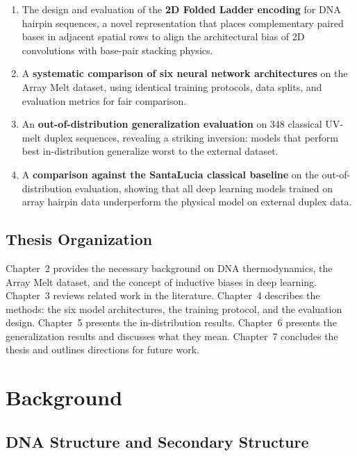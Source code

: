 \documentclass[12pt,oneside,letterpaper]{report}
\begin{document}
\begin{enumerate}
    \item The design and evaluation of the \textbf{2D Folded Ladder encoding} for DNA hairpin sequences, a novel representation that places complementary paired bases in adjacent spatial rows to align the architectural bias of 2D convolutions with base-pair stacking physics.
    \item A \textbf{systematic comparison of six neural network architectures} on the Array Melt dataset, using identical training protocols, data splits, and evaluation metrics for fair comparison.
    \item An \textbf{out-of-distribution generalization evaluation} on 348 classical UV-melt duplex sequences, revealing a striking inversion: models that perform best in-distribution generalize worst to the external dataset.
    \item A \textbf{comparison against the SantaLucia classical baseline} on the out-of-distribution evaluation, showing that all deep learning models trained on array hairpin data underperform the physical model on external duplex data.
\end{enumerate}

\section{Thesis Organization}

Chapter~2 provides the necessary background on DNA thermodynamics, the Array Melt dataset, and the concept of inductive biases in deep learning. Chapter~3 reviews related work in the literature. Chapter~4 describes the methods: the six model architectures, the training protocol, and the evaluation design. Chapter~5 presents the in-distribution results. Chapter~6 presents the generalization results and discusses what they mean. Chapter~7 concludes the thesis and outlines directions for future work.

\chapter{Background}

\section{DNA Structure and Secondary Structure}
\end{document}
